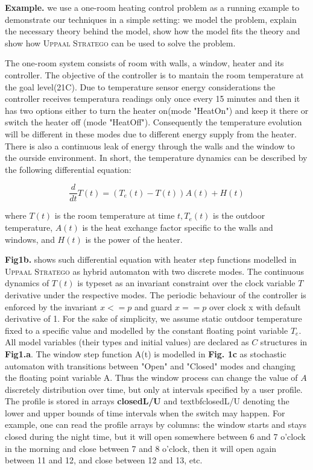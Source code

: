     \textbf{Example.} we use a one-room heating control problem 
    as a running example to demonstrate our techniques in a simple setting: we model 
    the problem, explain the necessary theory behind the model, show how the model fits
    the theory and show how \textsc{Uppaal Stratego} can be used to solve the problem.

    The one-room system consists of room with walls, a window, heater and its controller.
    The objective of the controller is to mantain the room temperature at the goal
    level(21C\degree). Due to temperature sensor energy considerations the controller receives 
    temperatura readings only once every 15 minutes and then it has two options either 
    to turn the heater on(mode "HeatOn") and keep it there or switch the heater off
    (mode "HeatOff"). Consequently the temperature evolution will be different in these
    modes due to different energy supply from the heater. There is also a continuous leak
    of energy through the walls and the window to the ourside environment. In short, the 
    temperature dynamics can be described by the following differential equation:

    \begin{equation}
        \frac{d}{dt}T(t)=(T_e(t)-T(t))A(t)+H(t)
    \end{equation}

    where $T(t)$ is the room temperature at time $t, T_e(t)$ is the outdoor 
    temperature, $A(t)$ is the heat exchange factor specific to the walls 
    and windows, and $H(t)$ is the power of the heater. 

    \textbf{Fig1b.} shows such differential equation with heater step functions 
    modelled in \textsc{Uppaal Stratego} as hybrid automaton with two discrete 
    modes. The continuous dynamics of $T(t)$ is typeset as an invariant constraint over the 
    clock variable $T$ derivative under the respective modes. The periodic 
    behaviour of the controller is enforced by the invariant $x<=p$ and guard
    $x==p$ over clock x with default derivative of 1. For the sake of simplicity,
    we assume static outdoor temperature fixed  to a specific value and 
    modelled by the constant floating point variable $T_e$. All model variables
    (their types and initial values) are declared as $C$ structures in \textbf{Fig1.a}. The
    window step function A(t) is modelled in \textbf{Fig. 1c} as stochastic automaton
    with transitions between "Open" and "Closed" modes and changing the floating point
    variable A. Thus the window process can change the value of $A$ discretely distribution
    over time, but only at intervals specified by a user profile. The profile is stored 
    in arrays \textbf{closedL/U} and textbf{closedL/U} denoting the lower and upper 
    bounds of time intervals when the switch may happen. For example, one can read the profile
    arrays by columns: the window starts and stays closed during the night time, but
    it will open somewhere between 6 and 7 o'clock in the morning and close between 
    7 and 8 o'clock, then it will open again between 11 and 12, and close between 12 and 13, etc.

